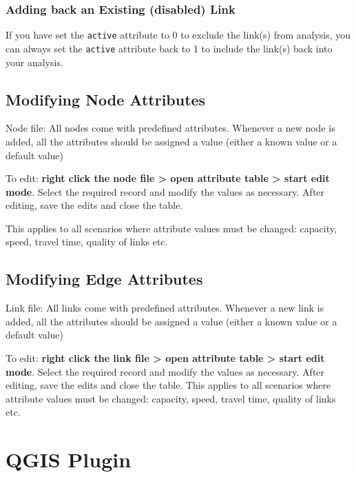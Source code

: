 \documentclass[
]{book}
\begin{document}
\section{Adding back an Existing (disabled) Link}\label{adding-back-an-existing-disabled-link}

If you have set the \texttt{active} attribute to 0 to exclude the link(s) from analysis, you can always set the \texttt{active} attribute back to 1 to include the link(s) back into your analysis.

\chapter{Modifying Node Attributes}\label{modifying-node-attributes}

Node file: All nodes come with predefined attributes. Whenever a new node is added, all the attributes should be assigned a value (either a known value or a default value)

To edit: \textbf{right click the node file \textgreater{} open attribute table \textgreater{} start edit mode}. Select the required record and modify the values as necessary. After editing, save the edits and close the table.

This applies to all scenarios where attribute values must be changed: capacity, speed, travel time, quality of links etc.

\chapter{Modifying Edge Attributes}\label{modifying-edge-attributes}

Link file: All links come with predefined attributes. Whenever a new link is added, all the attributes should be assigned a value (either a known value or a default value)

To edit: \textbf{right click the link file \textgreater{} open attribute table \textgreater{} start edit mode}. Select the required record and modify the values as necessary. After editing, save the edits and close the table. This applies to all scenarios where attribute values must be changed: capacity, speed, travel time, quality of links etc.

\part*{QGIS Plugin}\label{part-qgis-plugin}
\end{document}
